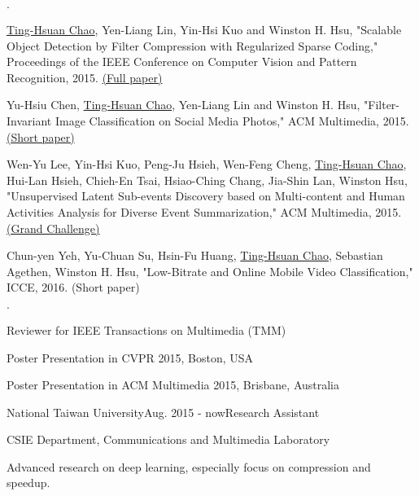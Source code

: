 \documentclass{joel_cv}
\begin{document}
\begin{sectionItemize}{$\cdot$}
	\item \underline{Ting-Hsuan Chao}, Yen-Liang Lin, Yin-Hsi Kuo and Winston H. Hsu, "Scalable Object Detection by Filter Compression with Regularized Sparse Coding," Proceedings of the IEEE Conference on Computer Vision and Pattern Recognition, 2015. \href{http://www.cv-foundation.org/openaccess/content_cvpr_2015/html/Chao_Scalable_Object_Detection_2015_CVPR_paper.html}{(Full paper)}
	\item Yu-Hsiu Chen, \underline{Ting-Hsuan Chao},  Yen-Liang Lin and Winston H. Hsu, "Filter-Invariant Image Classification on Social Media Photos," ACM Multimedia, 2015. \href{http://dl.acm.org/citation.cfm?id=2806348}{(Short paper)}
	\item Wen-Yu Lee, Yin-Hsi Kuo, Peng-Ju Hsieh, Wen-Feng Cheng, \underline{Ting-Hsuan Chao}, Hui-Lan Hsieh, Chieh-En Tsai, Hsiao-Ching Chang, Jia-Shin Lan, Winston Hsu, "Unsupervised Latent Sub-events Discovery based on Multi-content and Human Activities Analysis for Diverse Event Summarization,"  ACM Multimedia, 2015. \href{http://dl.acm.org/citation.cfm?id=2809935}{(Grand Challenge)}
	\item Chun-yen Yeh, Yu-Chuan Su, Hsin-Fu Huang, \underline{Ting-Hsuan Chao}, Sebastian Agethen, Winston H. Hsu, "Low-Bitrate and Online Mobile Video Classification," ICCE, 2016. (Short paper)
\end{sectionItemize}


%
%

\begin{sectionItemize}{$\cdot$}
	\item Reviewer for IEEE Transactions on Multimedia (TMM)
	\item Poster Presentation in CVPR 2015, Boston, USA
	\item Poster Presentation in ACM Multimedia 2015, Brisbane, Australia
\end{sectionItemize}

%
%


\begin{sectionContentNormal}{National Taiwan University}{Aug. 2015 - now}{Research Assistant}
	\item CSIE Department, Communications and Multimedia Laboratory
	\item Advanced research on deep learning, especially focus on compression and speedup.
\end{sectionContentNormal}
\end{document}
